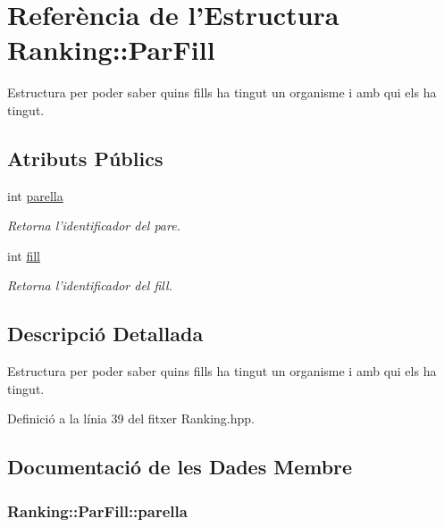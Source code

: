 \hypertarget{struct_ranking_1_1_par_fill}{\section{Referència de l'Estructura Ranking\-:\-:Par\-Fill}
\label{struct_ranking_1_1_par_fill}
}


Estructura per poder saber quins fills ha tingut un organisme i amb qui els ha tingut.  


\subsection*{Atributs Públics}
\begin{DoxyCompactItemize}
\item 
int \hyperlink{struct_ranking_1_1_par_fill_a73b7b596d987abbf7f27026317b5a85c}{parella}
\begin{DoxyCompactList}\small\item\em Retorna l'identificador del pare. \end{DoxyCompactList}\item 
int \hyperlink{struct_ranking_1_1_par_fill_a3b20e448cd957e593268c84368529b05}{fill}
\begin{DoxyCompactList}\small\item\em Retorna l'identificador del fill. \end{DoxyCompactList}\end{DoxyCompactItemize}


\subsection{Descripció Detallada}
Estructura per poder saber quins fills ha tingut un organisme i amb qui els ha tingut. 

Definició a la línia 39 del fitxer Ranking.\-hpp.



\subsection{Documentació de les Dades Membre}
\hypertarget{struct_ranking_1_1_par_fill_a73b7b596d987abbf7f27026317b5a85c}{
\subsubsection[{parella}]{\setlength{\rightskip}{0pt plus 5cm}Ranking\-::\-Par\-Fill\-::parella}}\label{struct_ranking_1_1_par_fill_a73b7b596d987abbf7f27026317b5a85c}


